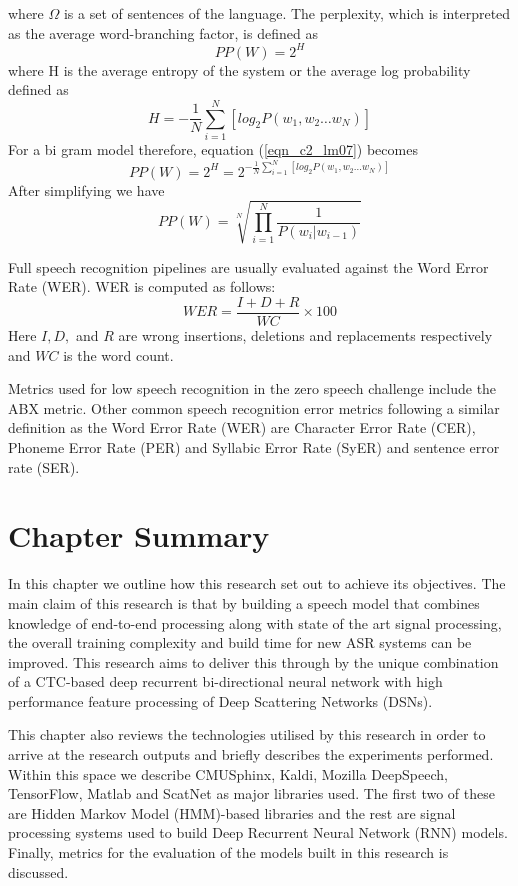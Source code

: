 where $\Omega$ is a set of sentences of the language. The perplexity, which is interpreted as the average word-branching factor, is defined as
\begin{equation}PP(W)=2^H
\label{eqn_c2_lm06}
\end{equation}
where H is the average entropy of the system or the average log probability defined as
\begin{equation}
H=-\frac{1}{N}\sum_{i=1}^N[log_2P(w_1,w_2\dots w_N)]
\label{eqn_c2_lm07}
\end{equation}
For a bi gram model therefore, equation (\ref{eqn_c2_lm07}) becomes
\begin{equation}
PP(W)=2^H=2^{-\frac{1}{N}\sum_{i=1}^N[log_2P(w_1,w_2\dots w_N)]}
\label{eqn_c2_lm08}
\end{equation}
After simplifying we have
\begin{equation}
PP(W)=\sqrt[N]{\prod_{i=1}^N\frac{1}{P(w_i|w_{i-1})}}
\label{eqn_c2_lm09}
\end{equation}


Full speech recognition pipelines are usually evaluated against the Word Error Rate (WER).  WER is computed as follows:
\begin{equation}\label{eqn_2_3_wer}
WER=\frac{I+D+R}{WC}\times 100
\end{equation}
Here $I,D,$ and $R$ are wrong insertions, deletions and replacements respectively and $WC$ is the word count.

Metrics used for low speech recognition in the zero speech challenge \citep{versteegh2015zero} include the ABX metric. Other common speech recognition error metrics following a similar definition as the Word Error Rate (WER) are Character Error Rate (CER), Phoneme Error Rate (PER) and Syllabic Error Rate (SyER) and sentence error rate (SER).

\section{Chapter Summary}
In this chapter we outline how this research set out to achieve its objectives.  The main claim of this research is that by building a speech model that combines knowledge of end-to-end processing along with state of the art signal processing, the overall training complexity and build time for new ASR systems can be improved.  This research aims to deliver this through by the unique combination of a CTC-based deep recurrent bi-directional neural network with high performance feature processing of Deep Scattering Networks (DSNs).

This chapter also reviews the technologies utilised by this research in order to arrive at the research outputs and briefly describes the experiments performed.  Within this space we describe CMUSphinx, Kaldi, Mozilla DeepSpeech, TensorFlow, Matlab and ScatNet as major libraries used.   The first two of these are Hidden Markov Model (HMM)-based libraries and the rest are  signal processing systems used to build Deep Recurrent Neural Network (RNN) models. Finally,  metrics for the evaluation of the models built in this research is discussed.
